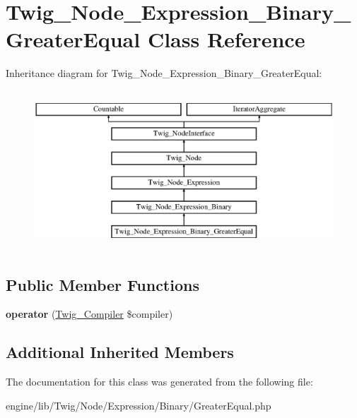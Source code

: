 \hypertarget{class_twig___node___expression___binary___greater_equal}{}\section{Twig\+\_\+\+Node\+\_\+\+Expression\+\_\+\+Binary\+\_\+\+Greater\+Equal Class Reference}
\label{class_twig___node___expression___binary___greater_equal}
Inheritance diagram for Twig\+\_\+\+Node\+\_\+\+Expression\+\_\+\+Binary\+\_\+\+Greater\+Equal\+:\begin{figure}[H]
\begin{center}
\leavevmode
\includegraphics[height=6.000000cm]{class_twig___node___expression___binary___greater_equal}
\end{center}
\end{figure}
\subsection*{Public Member Functions}
\begin{DoxyCompactItemize}
\item 
\hypertarget{class_twig___node___expression___binary___greater_equal_af77318ec88d5f8a508684970a150b670}{}{\bfseries operator} (\hyperlink{class_twig___compiler}{Twig\+\_\+\+Compiler} \$compiler)\label{class_twig___node___expression___binary___greater_equal_af77318ec88d5f8a508684970a150b670}

\end{DoxyCompactItemize}
\subsection*{Additional Inherited Members}


The documentation for this class was generated from the following file\+:\begin{DoxyCompactItemize}
\item 
engine/lib/\+Twig/\+Node/\+Expression/\+Binary/Greater\+Equal.\+php\end{DoxyCompactItemize}
